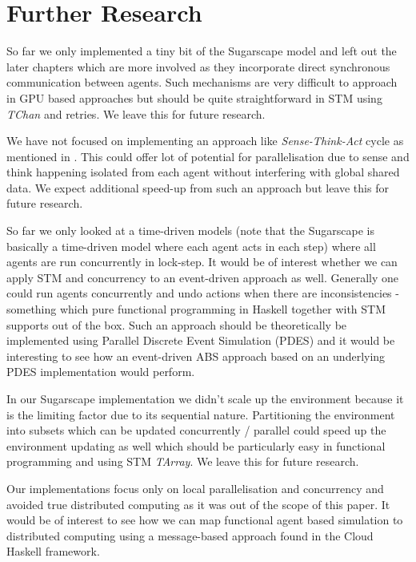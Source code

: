 \section{Further Research} %
\label{sec:further}

So far we only implemented a tiny bit of the Sugarscape model and left out the later chapters which are more involved as they incorporate direct synchronous communication between agents. Such mechanisms are very difficult to approach in GPU based approaches \cite{lysenko_framework_2008} but should be quite straightforward in STM using \textit{TChan} and retries. We leave this for future research.

We have not focused on implementing an approach like \textit{Sense-Think-Act} cycle as mentioned in \cite{xiao_survey_2018}. This could offer lot of potential for parallelisation due to sense and think happening isolated from each agent without interfering with global shared data. We expect additional speed-up from such an approach but leave this for future research.

So far we only looked at a time-driven models (note that the Sugarscape is basically a time-driven model where each agent acts in each step) where all agents are run concurrently in lock-step. It would be of interest whether we can apply STM and concurrency to an event-driven approach as well. Generally one could run agents concurrently and undo actions when there are inconsistencies - something which pure functional programming in Haskell together with STM supports out of the box. Such an approach should be theoretically be implemented using Parallel Discrete Event Simulation (PDES) \cite{fujimoto_parallel_1990} and it would be interesting to see how an event-driven ABS approach based on an underlying PDES implementation would perform.

In our Sugarscape implementation we didn't scale up the environment because it is the limiting factor due to its sequential nature. Partitioning the environment into subsets which can be updated concurrently / parallel could speed up the environment updating as well which should be particularly easy in functional programming and using STM \textit{TArray}. We leave this for future research.

Our implementations focus only on local parallelisation and concurrency and avoided true distributed computing as it was out of the scope of this paper. It would be of interest to see how we can map functional agent based simulation to distributed computing using a message-based approach found in the Cloud Haskell framework.